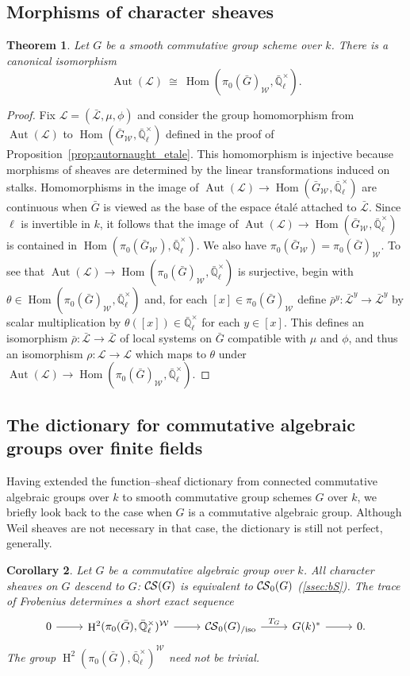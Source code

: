 \documentclass[10pt]{amsart}
\theoremstyle{plain}
\newtheorem{theorem}{Theorem}[section]
\newtheorem{corollary}[theorem]{Corollary}
\theoremstyle{definition}
\newcommand{\EE}{\mathbb{\bar Q}_\ell}
\newcommand{\Fq}{k}
\newcommand{\EEx}{\EE^\times}
\newcommand{\Weil}[1]{\mathcal{W}_{#1}}
\DeclareMathOperator{\Aut}{Aut}
\DeclareMathOperator{\Hom}{Hom}
\DeclareMathOperator{\Hh}{H}
\newcommand{\iso}{{\ \cong\ }}
\newcommand{\TrFrob}[1]{T_{#1}}
\newcommand{\cs}[1]{{\mathcal{#1}}}
\newcommand{\gcs}[1]{{\mathcal{\bar #1}}}
\newcommand{\CS}{{\mathcal{C\hskip-0.8pt S}}}
\newcommand{\bCS}{{\CS_0}}
\newcommand{\bCSiso}[1]{\bCS(#1)_{/\text{iso}}}
\newcommand{\bG}{\bar{G}}
\begin{document}
\subsection{Morphisms of character sheaves} \label{ssec:CSmor}

\begin{theorem}\label{thm:autornaught}
Let $G$ be a smooth commutative group scheme over $\Fq$.
There is a canonical isomorphism
\[
\Aut(\cs{L}) \iso \Hom(\pi_0(\bG)_{\Weil{}},\EEx).
\]
\end{theorem}
\begin{proof} 
Fix $\cs{L} = (\gcs{L},\mu,\phi)$ and consider the group homomorphism from $\Aut(\cs{L})$ to $\Hom(\bG_{\Weil{}},\EEx)$ defined in the proof of Proposition~\ref{prop:autornaught_etale}.
This homomorphism is injective because morphisms of sheaves are determined by the linear transformations induced on stalks.  
Homomorphisms in the image of $\Aut(\cs{L}) \to \Hom(\bG_{\Weil{}},\EEx)$ are continuous when $\bG$ is viewed as the base of the espace \'etal\'e attached to $\gcs{L}$.
Since $\ell$ is invertible in $\Fq$, it follows that the image of $\Aut(\cs{L}) \to \Hom(\bG_{\Weil{}},\EEx)$ is contained in $\Hom(\pi_0(\bG_{\Weil{}}),\EEx)$. 
We also have $\pi_0(\bG_{\Weil{}})=\pi_0(\bG)_{\Weil{}}$. 
To see that $\Aut(\cs{L}) \to \Hom(\pi_0(\bG)_{\Weil{}},\EEx)$ is surjective, begin with $\theta\in\Hom(\pi_0(\bG)_{\Weil{}},\EEx)$ and, for each $[x] \in \pi_0(\bG)_{\Weil{}}$ define $\bar\rho^y: \gcs{L}^y \to \gcs{L}^y$ by scalar multiplication by $\theta([x])\in \EEx$ for each $y\in [x]$.
This defines an isomorphism $\bar\rho : \gcs{L}\to \gcs{L}$ of local systems on $\bG$ compatible with $\mu$ and $\phi$, and thus an isomorphism $\rho :\cs{L}\to \cs{L}$ which maps to $\theta$ under $\Aut(\cs{L}) \to \Hom(\pi_0(\bG)_{\Weil{}},\EEx)$.
\end{proof}

\subsection{The dictionary for commutative algebraic groups over finite fields}

Having extended the function--sheaf dictionary from connected commutative algebraic groups over $\Fq$ to smooth commutative group schemes $G$ over $\Fq$, we briefly look back to the case when $G$ is a commutative algebraic group. 
Although Weil sheaves are not necessary in that case, the dictionary is still not perfect, generally.

\begin{corollary}\label{cor:alg_groups}
Let $G$ be a commutative algebraic group over $\Fq$.
All character sheaves on $G$ descend to $G$: $\CS(G)$ is equivalent to $\bCS(G)$ (\ref{ssec:bS}).
The trace of Frobenius determines a short exact sequence
\[
\begin{tikzcd}
0 \arrow{r} & \Hh^2(\pi_0(\bG),\EEx)^{\Weil{}} \arrow{r} & \bCSiso{G} \arrow{r}{\TrFrob{G}} & G(\Fq)^* \arrow{r} & 0.
\end{tikzcd}
\]
The group $\Hh^2(\pi_0(\bG),\EEx)^{\Weil{}}$ need not be trivial.
\end{corollary}
\end{document}
